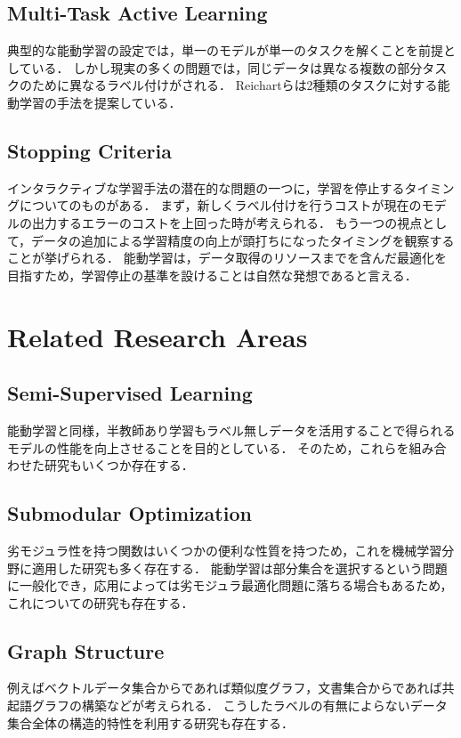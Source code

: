 \documentclass[11pt]{report}
\begin{document}
\subsection{Multi-Task Active Learning}
典型的な能動学習の設定では，単一のモデルが単一のタスクを解くことを前提としている．
しかし現実の多くの問題では，同じデータは異なる複数の部分タスクのために異なるラベル付けがされる．
Reichartら\cite{reichart2008multi}は2種類のタスクに対する能動学習の手法を提案している．

\subsection{Stopping Criteria}
インタラクティブな学習手法の潜在的な問題の一つに，学習を停止するタイミングについてのものがある．
まず，新しくラベル付けを行うコストが現在のモデルの出力するエラーのコストを上回った時が考えられる．
もう一つの視点として，データの追加による学習精度の向上が頭打ちになったタイミングを観察することが挙げられる．
能動学習は，データ取得のリソースまでを含んだ最適化を目指すため，学習停止の基準を設けることは自然な発想であると言える．

\section{Related Research Areas}

\subsection{Semi-Supervised Learning}
能動学習と同様，半教師あり学習もラベル無しデータを活用することで得られるモデルの性能を向上させることを目的としている．
そのため，これらを組み合わせた研究もいくつか存在する\cite{zhu2003combining}\cite{muslea2002active+}．

\subsection{Submodular Optimization}
劣モジュラ性を持つ関数はいくつかの便利な性質を持つため，これを機械学習分野に適用した研究も多く存在する．
能動学習は部分集合を選択するという問題に一般化でき，応用によっては劣モジュラ最適化問題に落ちる場合もあるため，
これについての研究も存在する\cite{golovin2011adaptive}\cite{golovin2010adaptive}．

\subsection{Graph Structure}
例えばベクトルデータ集合からであれば類似度グラフ，文書集合からであれば共起語グラフの構築などが考えられる．
こうしたラベルの有無によらないデータ集合全体の構造的特性を利用する研究も存在する\cite{jun2016graph}\cite{dasarathy2015s2}．



\end{document}
